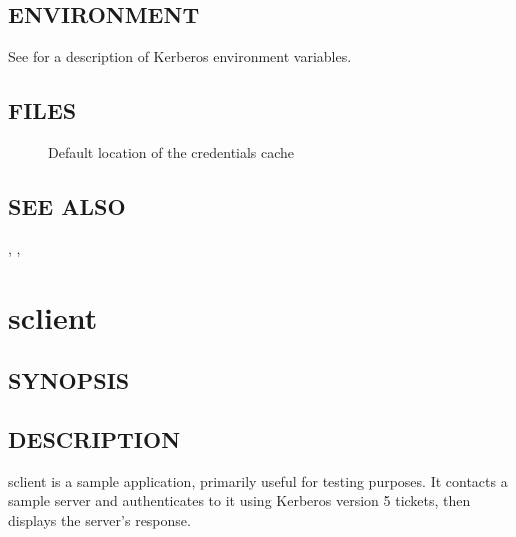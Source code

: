 \documentclass[letterpaper,10pt,english]{sphinxmanual}
\begin{document}
\subsection{ENVIRONMENT}
\label{\detokenize{user/user_commands/kvno:environment}}
\sphinxAtStartPar
See {\hyperref[\detokenize{user/user_config/kerberos:kerberos-7}]{}} for a description of Kerberos environment
variables.


\subsection{FILES}
\label{\detokenize{user/user_commands/kvno:files}}\begin{description}
\item[{}] \leavevmode
\sphinxAtStartPar
Default location of the credentials cache

\end{description}


\subsection{SEE ALSO}
\label{\detokenize{user/user_commands/kvno:see-also}}
\sphinxAtStartPar
{\hyperref[\detokenize{user/user_commands/kinit:kinit-1}]{}}, {\hyperref[\detokenize{user/user_commands/kdestroy:kdestroy-1}]{}}, {\hyperref[\detokenize{user/user_config/kerberos:kerberos-7}]{}}


\section{sclient}
\label{\detokenize{user/user_commands/sclient:sclient}}\label{\detokenize{user/user_commands/sclient:sclient-1}}\label{\detokenize{user/user_commands/sclient::doc}}

\subsection{SYNOPSIS}
\label{\detokenize{user/user_commands/sclient:synopsis}}
\sphinxAtStartPar
{} 


\subsection{DESCRIPTION}
\label{\detokenize{user/user_commands/sclient:description}}
\sphinxAtStartPar
sclient is a sample application, primarily useful for testing
purposes.  It contacts a sample server  and
authenticates to it using Kerberos version 5 tickets, then displays
the server’s response.
\end{document}
